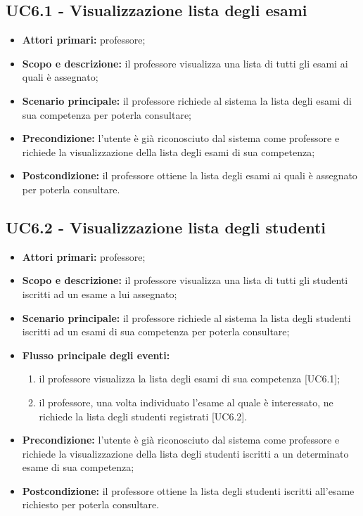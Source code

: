 \documentclass[AnalisiDeiRequisiti.tex]{subfiles}
\begin{document}
\subsection{UC6.1 - Visualizzazione lista degli esami}
\begin{itemize}
	\item \textbf{Attori primari:} professore;\\
	\item \textbf{Scopo e descrizione:} il professore visualizza una lista di tutti gli esami ai quali è assegnato;\\
	\item \textbf{Scenario principale:} il professore richiede al sistema la lista degli esami di sua competenza per poterla consultare;\\
	\item \textbf{Precondizione:} l'utente è già riconosciuto dal sistema come professore e richiede la visualizzazione della lista degli esami di sua competenza;\\
	\item \textbf{Postcondizione:} il professore ottiene la lista degli esami ai quali è assegnato per poterla consultare.\\
\end{itemize}

\subsection{UC6.2 - Visualizzazione lista degli studenti}
\begin{itemize}
	\item \textbf{Attori primari:} professore;\\
	\item \textbf{Scopo e descrizione:} il professore visualizza una lista di tutti gli studenti iscritti ad un esame a lui assegnato;\\
	\item \textbf{Scenario principale:} il professore richiede al sistema la lista degli studenti iscritti ad un esami di sua competenza per poterla consultare;\\
	\item \textbf{Flusso principale degli eventi:}\\
	\begin{enumerate}
		\item il professore visualizza la lista degli esami di sua competenza [UC6.1];
		\item il professore, una volta individuato l'esame al quale è interessato, ne richiede la lista degli studenti registrati [UC6.2].
	\end{enumerate}
	\item \textbf{Precondizione:} l'utente è già riconosciuto dal sistema come professore e richiede la visualizzazione della lista degli studenti iscritti a un determinato esame di sua competenza;\\
	\item \textbf{Postcondizione:} il professore ottiene la lista degli studenti iscritti all'esame richiesto per poterla consultare.\\
\end{itemize}
\end{document}
